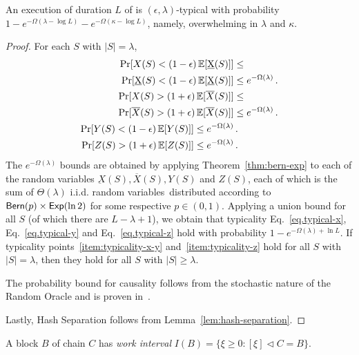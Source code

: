 \begin{theorem}[Typicality]\label{thm:typicality}
  An execution of duration $L$ of \poem is $(\epsilon, \lambda)$-typical with
  probability $1 - e^{-\Omega(\lambda - \log L)} - e^{-\Omega(\kappa - \log L)}$,
  namely, overwhelming in $\lambda$ and $\kappa$.
\end{theorem}
\begin{proof}
  For each $S$ with $|S| = \lambda$,
  \begin{align*}
    \Pr[X(S) < (1 - \epsilon)\mathop{{}\mathbb{E}}[\underbar{X}(S)]] &\leq\\
    \Pr[\underbar{X}(S) < (1 - \epsilon)\mathop{{}\mathbb{E}}[\underbar{X}(S)]] &\leq
    e^{-\Omega(\lambda)} \,.\\
    \Pr[X(S) > (1 + \epsilon)\mathop{{}\mathbb{E}}[\overline{X}(S)]] &\leq\\
    \Pr[\overline{X}(S) > (1 + \epsilon)\mathop{{}\mathbb{E}}[\overline{X}(S)]] &\leq
    e^{-\Omega(\lambda)} \,.\\
    \Pr[Y(S) < (1 - \epsilon)\mathop{{}\mathbb{E}}[Y(S)]] \leq e^{-\Omega(\lambda)} &\,.\\
    \Pr[Z(S) > (1 + \epsilon)\mathop{{}\mathbb{E}}[Z(S)]] \leq e^{-\Omega(\lambda)} &\,.\\
  \end{align*}
  The $e^{-\Omega(\lambda)}$ bounds are obtained by applying
  Theorem~\ref{thm:bern-exp} to each of the random variables
  $\underbar{X}(S), \overline{X}(S), Y(S)$ and $Z(S)$, each
  of which is the sum of $\Theta(\lambda)$ i.i.d. random variables\
  distributed according to $\textsf{Bern}(p) \times \textsf{Exp}(\ln2)$ for
  some respective $p \in (0, 1)$.
  Applying a union bound for all $S$ (of which there are $L - \lambda + 1$),
  we obtain that typicality Eq.~\ref{eq.typical-x}, Eq.~\ref{eq.typical-y}
  and Eq.~\ref{eq.typical-z}
  hold with probability $1 - e^{-\Omega(\lambda)+\ln L}$.
  If typicality points~\ref{item:typicality-x-y} and~\ref{item:typicality-z}
  hold for all $S$ with $|S| = \lambda$, then they hold for all $S$ with
  $|S| \geq \lambda$.

  The probability bound for causality follows from the stochastic nature
  of the Random Oracle and is proven in~\cite{backbone}.

  Lastly, Hash Separation follows from Lemma~\ref{lem:hash-separation}.
  \Qed
\end{proof}

\begin{definition}
  A block $B$ of chain $C$ has \emph{work interval}
  $I(B) = \{\xi \geq 0: [\xi] \lhd C = B\}$.
\end{definition}

